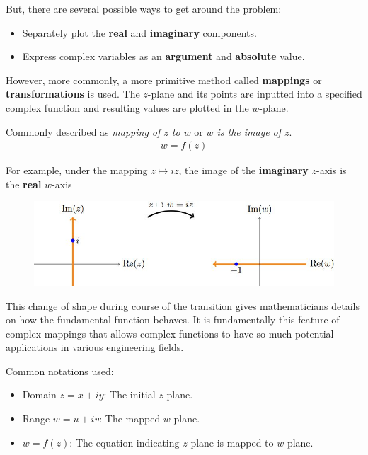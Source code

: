 \documentclass[10pt,a4paper]{article}
\begin{document}
But, there are several possible ways to get around the problem:
\begin{itemize}
    \item Separately plot the \textbf{real} and \textbf{imaginary} components.
    \item Express complex variables as an \textbf{argument} and \textbf{absolute} value. 
\end{itemize}

However, more commonly, a more primitive method called \textbf{mappings} or \textbf{transformations}
is used. The $z$-plane and its points are inputted into a specified complex function and
resulting values are plotted in the $w$-plane. 

Commonly described as \textit{mapping of $z$ to $w$} or \textit{$w$ is the image of $z$}.
\begin{align*}
    w = f(z)
\end{align*}

For example, under the mapping $z \mapsto iz$, the image of the \textbf{imaginary} $z$-axis is the
\textbf{real} $w$-axis
\begin{figure} [h!]
    \centering
    \includegraphics[scale=0.7]{Map meaning.JPG}
\end{figure}

This change of shape during course of the transition gives mathematicians details on how the
fundamental function behaves. It is fundamentally this feature of complex mappings that allows
complex functions to have so much potential applications in various engineering fields.

Common notations used:
\begin{itemize}
    \item Domain $z=x+iy$: The initial $z$-plane.
    \item Range $w=u+iv$: The mapped $w$-plane.
    \item $w=f(z)$: The equation indicating $z$-plane is mapped to $w$-plane.
\end{itemize}

\pagebreak

\end{document}
